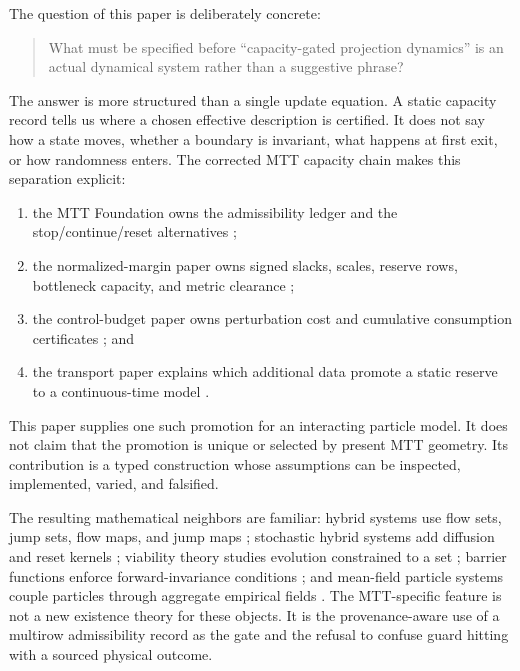 \documentclass[11pt]{article}
\theoremstyle{definition}
\theoremstyle{remark}
\begin{document}
The question of this paper is deliberately concrete:

\begin{quote}
What must be specified before ``capacity-gated projection dynamics'' is an
actual dynamical system rather than a suggestive phrase?
\end{quote}

The answer is more structured than a single update equation.  A static
capacity record tells us where a chosen effective description is certified.
It does not say how a state moves, whether a boundary is invariant, what
happens at first exit, or how randomness enters.  The corrected MTT
capacity chain makes this separation explicit:

\begin{enumerate}[leftmargin=2em]
\item the MTT Foundation owns the admissibility ledger and the
      stop/continue/reset alternatives \cite{MTTFoundation2026};
\item the normalized-margin paper owns signed slacks, scales, reserve rows,
      bottleneck capacity, and metric clearance \cite{CapacityMargin2026};
\item the control-budget paper owns perturbation cost and cumulative
      consumption certificates \cite{CapacityBudget2026}; and
\item the transport paper explains which additional data promote a static
      reserve to a continuous-time model \cite{CapacityDynamics2026}.
\end{enumerate}

This paper supplies one such promotion for an interacting particle model.
It does not claim that the promotion is unique or selected by present MTT
geometry.  Its contribution is a typed construction whose assumptions can
be inspected, implemented, varied, and falsified.

The resulting mathematical neighbors are familiar: hybrid systems use
flow sets, jump sets, flow maps, and jump maps
\cite{GoebelSanfeliceTeel2009,GoebelSanfeliceTeel2012}; stochastic hybrid
systems add diffusion and reset kernels \cite{HuLygerosSastry2000}; viability
theory studies evolution constrained to a set \cite{Aubin2009}; barrier
functions enforce forward-invariance conditions \cite{AmesEtAl2017}; and
mean-field particle systems couple particles through aggregate empirical
fields \cite{ChaintronDiez2022}.  The MTT-specific feature is not a new
existence theory for these objects.  It is the provenance-aware use of a
multirow admissibility record as the gate and the refusal to confuse guard
hitting with a sourced physical outcome.
\end{document}
